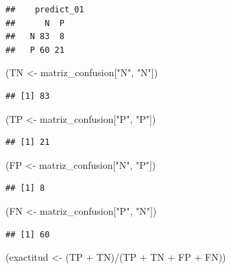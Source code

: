 \documentclass[
  12pt,
]{book}
\newenvironment{Shaded}{\begin{snugshade}}{\end{snugshade}}
\newcommand{\NormalTok}[1]{#1}
\newcommand{\OtherTok}[1]{\textcolor[rgb]{0.56,0.35,0.01}{#1}}
\newcommand{\SpecialCharTok}[1]{\textcolor[rgb]{0.00,0.00,0.00}{#1}}
\newcommand{\StringTok}[1]{\textcolor[rgb]{0.31,0.60,0.02}{#1}}
\begin{document}
\begin{verbatim}
##    predict_01
##      N  P
##   N 83  8
##   P 60 21
\end{verbatim}

\begin{Shaded}
\begin{Highlighting}[]
\NormalTok{(TN }\OtherTok{\textless{}{-}}\NormalTok{ matriz\_confusion[}\StringTok{"N"}\NormalTok{, }\StringTok{"N"}\NormalTok{])}
\end{Highlighting}
\end{Shaded}

\begin{verbatim}
## [1] 83
\end{verbatim}

\begin{Shaded}
\begin{Highlighting}[]
\NormalTok{(TP }\OtherTok{\textless{}{-}}\NormalTok{ matriz\_confusion[}\StringTok{"P"}\NormalTok{, }\StringTok{"P"}\NormalTok{])}
\end{Highlighting}
\end{Shaded}

\begin{verbatim}
## [1] 21
\end{verbatim}

\begin{Shaded}
\begin{Highlighting}[]
\NormalTok{(FP }\OtherTok{\textless{}{-}}\NormalTok{ matriz\_confusion[}\StringTok{"N"}\NormalTok{, }\StringTok{"P"}\NormalTok{])}
\end{Highlighting}
\end{Shaded}

\begin{verbatim}
## [1] 8
\end{verbatim}

\begin{Shaded}
\begin{Highlighting}[]
\NormalTok{(FN }\OtherTok{\textless{}{-}}\NormalTok{ matriz\_confusion[}\StringTok{"P"}\NormalTok{, }\StringTok{"N"}\NormalTok{])}
\end{Highlighting}
\end{Shaded}

\begin{verbatim}
## [1] 60
\end{verbatim}

\begin{Shaded}
\begin{Highlighting}[]
\NormalTok{(exactitud }\OtherTok{\textless{}{-}}\NormalTok{ (TP }\SpecialCharTok{+}\NormalTok{ TN)}\SpecialCharTok{/}\NormalTok{(TP }\SpecialCharTok{+}\NormalTok{ TN }\SpecialCharTok{+}\NormalTok{ FP }\SpecialCharTok{+}\NormalTok{ FN))}
\end{Highlighting}
\end{Shaded}
\end{document}
